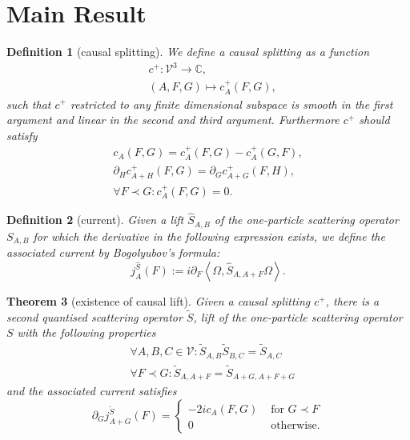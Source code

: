\documentclass[b5paper,draft,openbib,12pt]{memoir}
\newtheorem{Def}{Definition}
\newtheorem{Thm}[Def]{Theorem}
\begin{document}
\section{Main Result}


\begin{Def}[causal splitting]
We define a causal splitting as a function 
\begin{align}
&c^+:\mathcal{V}^3\rightarrow \mathbb{C}, \\
&(A,F,G)\mapsto c_A^+(F,G),
\end{align}
such that \(c^+\) restricted to any finite dimensional subspace is smooth in the 
first argument and linear in the second and third argument.
Furthermore \(c^+\) should satisfy
\begin{align}\label{c+ 1}
c_A(F,G)=c_A^+(F,G)-c_A^+(G,F),\\\label{c+ 2}
\partial_H c^+_{A+H}(F,G)=\partial_G c^+_{A+G}(F,H),\\\label{c+ 3}
\forall F \prec G: c_A^+(F,G)=0.
\end{align}
\end{Def}

\begin{Def}[current]
Given a lift \(\hat{S}_{A,B}\) of the one-particle scattering operator \(S_{A,B}\) for which the derivative in the following expression exists,
 we define the associated current by Bogolyubov's formula:
\begin{equation}
j_A^{\hat{S}}(F):=i\partial_F \left\langle \Omega, \hat{S}_{A,A+F} \Omega\right\rangle.
\end{equation}
\end{Def}

\begin{Thm}[existence of causal lift]\label{thm: geometry}
Given a causal splitting \(c^+\), there is a second quantised scattering operator \(\tilde{S}\), lift of the one-particle scattering operator \(S\)
with the following properties
\begin{align}
&\forall A,B,C\in \mathcal{V}:\tilde{S}_{A,B}\tilde{S}_{B,C}=\tilde{S}_{A,C}\\
&\forall F\prec G: \tilde{S}_{A,A+F}=\tilde{S}_{A+G,A+F+G}
\end{align}
and the associated current satisfies
\begin{equation}
\partial_G j_{A+G}^{\tilde{S}}(F)=\left\{\begin{matrix} -2i c_A(F,G)  &\text{ for } G\prec F\\ 0 &\text{  otherwise.}  \end{matrix} \right.
\end{equation}
\end{Thm}
\end{document}
